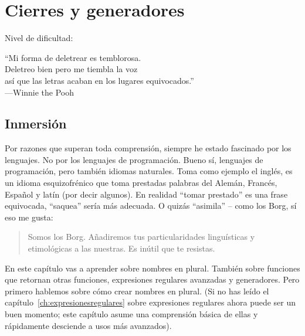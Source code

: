 
\chapter{Cierres y generadores}\label{ch:cierres}

\noindent
Nivel de dificultad:\diflll

\begin{citaCap}
``Mi forma de deletrear es temblorosa. \\
Deletreo bien pero me tiembla la voz  \\
así que las letras acaban en los lugares equivocados.'' \\
---Winnie the Pooh
\end{citaCap}

\section{Inmersión}

Por razones que superan toda comprensión, siempre he estado fascinado por los lenguajes. No por los lenguajes de programación. Bueno sí, lenguajes de programación, pero también idiomas naturales. Toma como ejemplo el inglés, es un idioma esquizofrénico que toma prestadas palabras del Alemán, Francés, Español y latín (por decir algunos). En realidad ``tomar prestado'' es una frase equivocada, ``saquea'' sería más adecuada. O quizás ``asimila'' -- como los Borg, sí eso me gusta:

\begin{quote}
Somos los Borg. Añadiremos tus particularidades linguísticas y etimológicas a las nuestras. Es inútil que te resistas. 
\end{quote}

En este capítulo vas a aprender sobre nombres en plural. También sobre funciones que retornan otras funciones, expresiones regulares avanzadas y generadores. Pero primero hablemos sobre cómo crear nombres en plural. (Si no has leído el capítulo~\ref{ch:expresionesregulares} sobre expresiones regulares ahora puede ser un buen momento; este capítulo asume una comprensión básica de ellas y rápidamente desciende a usos más avanzados). 

